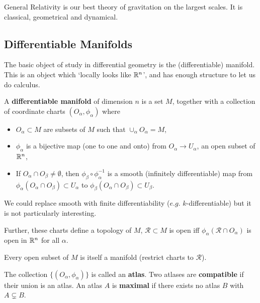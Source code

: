 

General Relativity is our best theory of gravitation on the largest scales. It is classical, geometrical and dynamical.

\subsection{Differentiable Manifolds}

The basic object of study in differential geometry is the (differentiable) manifold. This is an object which `locally looks like $\mathbb{R}^{n}$', and has enough structure to let us do calculus.

\begin{definition}
    A \textbf{differentiable manifold} of dimension $n$ is a set $M$, together with a collection of coordinate charts $\left( O_\alpha, \phi_\alpha \right) $ where
    \begin{itemize}
        \item $O_{\alpha} \subset M$ are subsets of $M$ such that $\cup_{\alpha} O_\alpha = M$,
        \item $\phi_\alpha$ is a bijective map (one to one and onto) from $O_{\alpha} \to U_{\alpha}$, an open subset of $\mathbb{R}^{n}$,
        \item If $O_{\alpha} \cap O_{\beta} \neq \emptyset$, then $\phi_{\beta} \circ \phi_{\alpha}^{-1}$ is a smooth (infinitely differentiable) map from $\phi_{\alpha}\left( O_{\alpha} \cap O_{\beta} \right) \subset U_{\alpha}$ to $\phi_{\beta} \left( O_{\alpha} \cap O_{\beta} \right) \subset U_{\beta}$.
    \end{itemize}
\end{definition}

\begin{note}
    We could replace smooth with finite differentiability ($e.g.$ $k$-differentiable) but it is not particularly interesting.

    Further, these charts define a topology of $M$, $\mathcal{R} \subset M$ is open iff $\phi_{\alpha} \left( \mathcal{R} \cap O_{\alpha} \right) $ is open in $\mathbb{R}^{n}$ for all $\alpha$. 

    Every open subset of $M$ is itself a manifold (restrict charts to $\mathcal{R}$).
\end{note}

\begin{definition}
    The collection $\{\left( O_\alpha, \phi_\alpha \right) \} $ is called an \textbf{atlas}. Two atlases are \textbf{compatible} if their union is an atlas. An atlas $A$ is \textbf{maximal} if there exists no atlas $B$ with $A \subsetneq B$. 
\end{definition}

